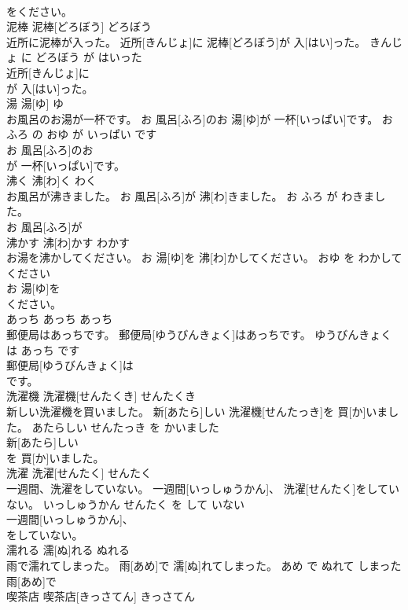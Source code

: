 \documentclass[8pt]{extreport}
\begin{document}
\begin{CJK}{UTF8}{min}
\\	をください。			
\\	泥棒	泥棒[どろぼう]	どろぼう	
\\	近所に泥棒が入った。	近所[きんじょ]に 泥棒[どろぼう]が 入[はい]った。	きんじょ に どろぼう が はいった	
\\	近所[きんじょ]に
\\	が 入[はい]った。			
\\	湯	湯[ゆ]	ゆ	
\\	お風呂のお湯が一杯です。	お 風呂[ふろ]のお 湯[ゆ]が 一杯[いっぱい]です。	おふろ の おゆ が いっぱい です	
\\	お 風呂[ふろ]のお
\\	が 一杯[いっぱい]です。			
\\	沸く	沸[わ]く	わく	
\\	お風呂が沸きました。	お 風呂[ふろ]が 沸[わ]きました。	お ふろ が わきました。	
\\	お 風呂[ふろ]が
\\	沸かす	沸[わ]かす	わかす	
\\	お湯を沸かしてください。	お 湯[ゆ]を 沸[わ]かしてください。	おゆ を わかして ください	
\\	お 湯[ゆ]を
\\	ください。			
\\	あっち	あっち	あっち	
\\	郵便局はあっちです。	郵便局[ゆうびんきょく]はあっちです。	ゆうびんきょく は あっち です	
\\	郵便局[ゆうびんきょく]は
\\	です。			
\\	洗濯機	洗濯機[せんたくき]	せんたくき	
\\	新しい洗濯機を買いました。	新[あたら]しい 洗濯機[せんたっき]を 買[か]いました。	あたらしい せんたっき を かいました	
\\	新[あたら]しい
\\	を 買[か]いました。			
\\	洗濯	洗濯[せんたく]	せんたく	
\\	一週間、洗濯をしていない。	一週間[いっしゅうかん]、 洗濯[せんたく]をしていない。	いっしゅうかん せんたく を して いない	
\\	一週間[いっしゅうかん]、
\\	をしていない。			
\\	濡れる	濡[ぬ]れる	ぬれる	
\\	雨で濡れてしまった。	雨[あめ]で 濡[ぬ]れてしまった。	あめ で ぬれて しまった	
\\	雨[あめ]で
\\	喫茶店	喫茶店[きっさてん]	きっさてん	

\end{CJK}
\end{document}

